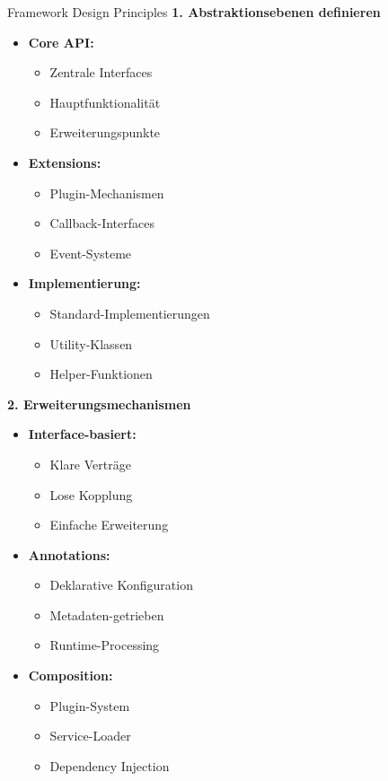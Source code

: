 \begin{KR}{Framework Design Principles}
\textbf{1. Abstraktionsebenen definieren}
\begin{itemize}
    \item \textbf{Core API:}
    \begin{itemize}
        \item Zentrale Interfaces
        \item Hauptfunktionalität
        \item Erweiterungspunkte
    \end{itemize}
    
    \item \textbf{Extensions:}
    \begin{itemize}
        \item Plugin-Mechanismen
        \item Callback-Interfaces
        \item Event-Systeme
    \end{itemize}
    
    \item \textbf{Implementierung:}
    \begin{itemize}
        \item Standard-Implementierungen
        \item Utility-Klassen
        \item Helper-Funktionen
    \end{itemize}
\end{itemize}

\textbf{2. Erweiterungsmechanismen}
\begin{itemize}
    \item \textbf{Interface-basiert:}
    \begin{itemize}
        \item Klare Verträge
        \item Lose Kopplung
        \item Einfache Erweiterung
    \end{itemize}
    
    \item \textbf{Annotations:}
    \begin{itemize}
        \item Deklarative Konfiguration
        \item Metadaten-getrieben
        \item Runtime-Processing
    \end{itemize}
    
    \item \textbf{Composition:}
    \begin{itemize}
        \item Plugin-System
        \item Service-Loader
        \item Dependency Injection
    \end{itemize}
\end{itemize}
\end{KR}

